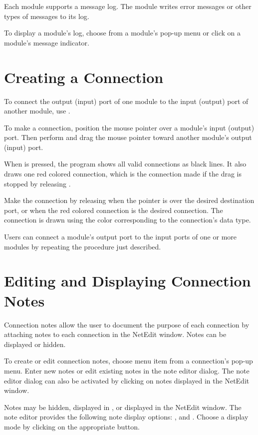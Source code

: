 Each module supports a message log. The module writes error messages
or other types of messages to its log.

To display a module's log, choose  from a module's
pop-up menu or click  on a module's message indicator.


\section{Creating a Connection}
\label{sec:connectmods}

To connect the output (input) port of one module to the input (output)
port of another module, use .

To make a connection, position the mouse pointer over a module's input
(output) port.  Then perform  and drag the
mouse pointer toward another module's output (input) port.

When  is pressed, the program shows all valid connections as black
lines.  It also draws one red colored connection, which is the
connection made if the drag is stopped by releasing .

Make the connection by releasing  when the pointer is over the
desired destination port, or when the red colored connection is the
desired connection.  The connection is drawn using the color
corresponding to the connection's data type.

Users can connect a module's output port to the input ports of one or more
modules by repeating the procedure just described.

\section{Editing and Displaying Connection Notes}
\label{sec:displaynotes}

Connection notes allow the user to document the purpose of
each connection by attaching notes to each connection in the NetEdit window.
Notes can be displayed or hidden.

To create or edit connection notes, choose menu item
 from a connection's pop-up menu. Enter new notes
or edit existing notes in the note editor dialog.  The note editor
dialog can also be activated by clicking  on notes
displayed in the NetEdit window.

Notes may be hidden, displayed in , or displayed in the
NetEdit window.  The note editor provides the following note display
options: ,  and .
Choose a display mode by clicking  on the
appropriate button.

